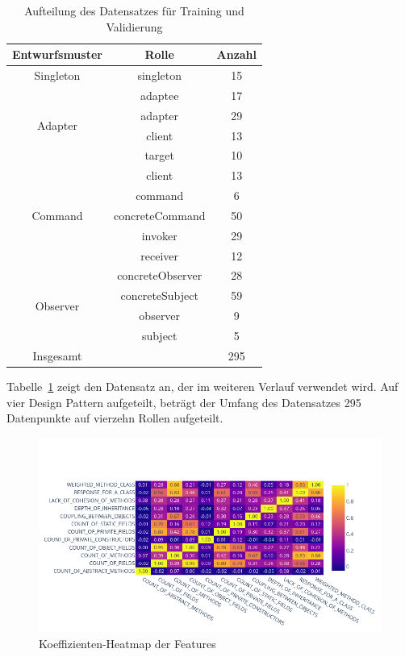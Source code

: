 \begin{table}[H]
    \begin{tabular}{|c|c|c|}
        \hline
        Entwurfsmuster & Rolle & Anzahl\\
        \hline
        Singleton & singleton & 15\\
        \hline
        \multirow{4}{*}{Adapter} & adaptee & 17\\ & adapter & 29\\ & client & 13\\ & target & 10\\
        \hline
        \multirow{5}{*}{Command} & client & 13\\ & command & 6\\ & concreteCommand & 50\\ & invoker & 29\\ & receiver & 12\\
        \hline
        \multirow{4}{*}{Observer} & concreteObserver & 28\\ & concreteSubject & 59\\ & observer & 9\\ & subject & 5\\
        \hhline{|=|=|=|}
        Insgesamt & & 295\\
        \hline
    \end{tabular}
    \caption{Aufteilung des Datensatzes für Training und Validierung}
    \label{tab:dataset_dist}
\end{table}

Tabelle~\ref{tab:dataset_dist} zeigt den Datensatz an, der im weiteren Verlauf verwendet wird. Auf vier Design Pattern aufgeteilt,
beträgt der Umfang des Datensatzes 295 Datenpunkte auf vierzehn Rollen aufgeteilt.

\begin{figure}[h]
    \centering
    \includegraphics[scale=0.5]{figures/coff_heat_map.png}
    \caption{Koeffizienten-Heatmap der Features}
    \label{fig:coeff_heat_map}
\end{figure}

